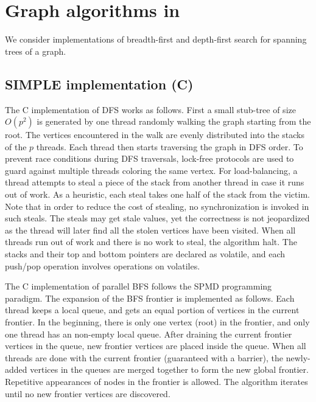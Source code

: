 \section{Graph algorithms in \XWS}\label{sec:Graph}

We consider implementations of breadth-first and depth-first search for spanning trees of a graph.



\subsection{SIMPLE implementation (C)}

The C implementation of DFS works as follows. First a small stub-tree
of size $O(p^2)$ is generated by one thread randomly walking the graph
starting from the root.  The vertices encountered in the walk are
evenly distributed into the stacks of the $p$ threads. Each thread
then starts traversing the graph in DFS order.  To prevent race
conditions during DFS traversals, lock-free protocols are used to
guard against multiple threads coloring the same vertex. For
load-balancing, a thread attempts to steal a piece of the stack from
another thread in case it runs out of work. As a heuristic, each steal
takes one half of the stack from the victim. Note that in order to
reduce the cost of stealing, no synchronization is invoked in such
steals. The steals may get stale values, yet the correctness is not
jeopardized as the thread will later find all the stolen vertices have
been visited.  When all threads run out of work and there is no work
to steal, the algorithm halt. The stacks and their top and bottom
pointers are declared as volatile, and each push/pop operation
involves operations on volatiles.

The C implementation of parallel BFS follows the SPMD programming
paradigm. The expansion of the BFS frontier is implemented as
follows. Each thread keeps a local queue, and gets an equal portion of
vertices in the current frontier. In the beginning, there is only one
vertex (root) in the frontier, and only one thread has an non-empty
local queue. After draining the current frontier vertices in the
queue, new frontier vertices are placed inside the queue. When all
threads are done with the current frontier (guaranteed with a
barrier), the newly-added vertices in the queues are merged together
to form the new global frontier. Repetitive appearances of nodes in
the frontier is allowed. The algorithm iterates until no new frontier
vertices are discovered.

